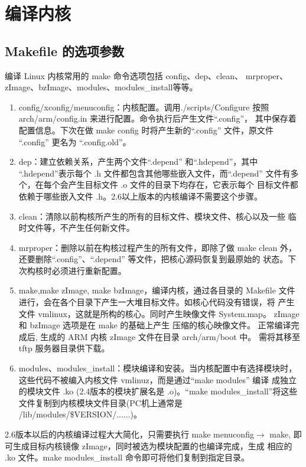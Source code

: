 \section{编译内核}
\subsection{Makefile 的选项参数}
	编译 Linux 内核常用的 make 命令选项包括 config、dep、clean、
mrproper、zImage、bzImage、modules、modules\_install等等。
\begin{enumerate}
  \item config/xconfig/menuconfig：内核配置。调用./scripts/Configure 按照
		arch/arm/config.in 来进行配置。命令执行后产生文件``.config''，
		其中保存着配置信息。下次在做 make config 时将产生新的``.config''
		文件，原文件 ``.config'' 更名为 ``.config.old''。
  \item dep：建立依赖关系，产生两个文件``.depend'' 和``.hdepend''，其中
		``.hdepend''表示每个 .h 文件都包含其他哪些嵌入文件，而``.depend''
		文件有多个，在每个会产生目标文件 .o 文件的目录下均存在，它表示每个
		目标文件都依赖于哪些嵌入文件 .h。2.6以上版本的内核编译不需要这个步骤。
  \item clean：清除以前构核所产生的所有的目标文件、模块文件、核心以及一些
		临时文件等，不产生任何新文件。
  \item mrproper：删除以前在构核过程产生的所有文件，即除了做 make clean 外，
		还要删除``.config''、``.depend'' 等文件，把核心源码恢复到最原始的
		状态。下次构核时必须进行重新配置。
  \item make,make zImage, make bzImage，编译内核，通过各目录的 Makefile
		文件进行，会在各个目录下产生一大堆目标文件。如核心代码没有错误，将
		产生文件 vmlinux，这就是所构的核心。同时产生映像文件 System.map。
		zImage 和 bzImage 选项是在 make 的基础上产生 压缩的核心映像文件。
		正常编译完成后, 生成的 ARM 内核 zImage 文件在目录 arch/arm/boot 中。
		需将其移至 tftp 服务器目录供下载。
  \item modules、modules\_install：模块编译和安装。当内核配置中有选择模块时，
		这些代码不被编入内核文件 vmlinuz，而是通过``make modules'' 编译
		成独立的模块文件 .ko (2.4版本的模块扩展名是 .o)。``make
		modules\_install''将这些文件复制到内核模块文件目录(PC机上通常是
		/lib/modules/\$VERSION/......)。
\end{enumerate}

	2.6版本以后的内核编译过程大大简化，只需要执行 make menuconfig$\to$
make, 即可生成目标内核镜像 zImage，同时被选为模块配置的也编译完成，生成
相应的 .ko 文件。make modules\_install 命令即可将他们复制到指定目录。

